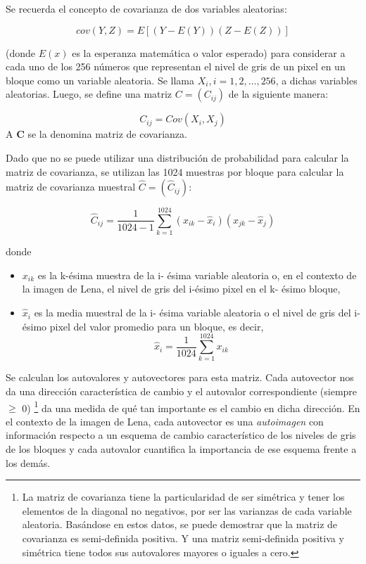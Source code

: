 \documentclass[twocolumn,a4paper,10pt]{article}
\begin{document}
Se recuerda el concepto de covarianza de dos variables aleatorias:

\begin{equation}
    cov(Y, Z) = E [(Y - E(Y )) (Z - E(Z))]
\end{equation}

(donde $E(x)$ es la esperanza matem\'atica o valor esperado) para considerar a cada uno de los 256 n\'umeros que representan el nivel de gris de un pixel en un bloque como un variable aleatoria.
Se llama $X_{i}, i = 1, 2, \dotsc, 256$, a dichas variables aleatorias. Luego, se define una matriz $C = (C_{ij} )$ de la siguiente manera:

\begin{equation}
    C_{ij} = Cov(X_{i}, X_{j})
\end{equation}
A $\textbf{C}$ se la denomina matriz de covarianza.

Dado que no se puede utilizar una distribución de probabilidad para calcular la matriz de covarianza, se utilizan las 1024 muestras por bloque para calcular la matriz de covarianza muestral $\widehat{C} = (\widehat{C}_{ij})$:

\begin{equation}
    \widehat{C}_{ij} =  \frac{1}{1024 - 1}\sum_{k=1}^{1024} (x_{ik} - \widehat{x}_{i}) (x_{jk} - \widehat{x}_{j})
\end{equation}

donde
\begin{itemize}
    \item $x_{ik}$ es la k-\'esima muestra de la i- \'esima variable aleatoria o, en el contexto de la imagen de Lena, el nivel de gris del i-\'esimo pixel en el 
    k- \'esimo bloque,
    \item $\widehat{x}_{i}$ es la media muestral de la i- \'esima variable aleatoria o el nivel de gris del i-\'esimo pixel del valor promedio para un bloque, es decir,
    \[ \widehat{x}_{i} = \frac{1}{1024} \sum_{k=1}^{1024} x_{ik} \]
\end{itemize}

Se calculan los autovalores y autovectores para esta matriz. Cada autovector nos da una direcci\'on caracter\'istica de cambio y el autovalor correspondiente  (siempre $\geq$ 0) \footnote{La matriz de covarianza tiene la particularidad de ser sim\'etrica y tener los elementos de la diagonal no negativos, por ser las varianzas de cada variable aleatoria. Bas\'andose en estos datos, se puede demostrar que la matriz de covarianza es semi-definida positiva. Y una matriz semi-definida positiva y sim\'etrica tiene todos sus autovalores mayores o iguales a cero.} da una medida de qu\'e tan importante es el cambio en dicha direcci\'on. En el contexto de la imagen de Lena, cada autovector es una \textit{autoimagen} con información respecto a un esquema de cambio caracter\'istico de los niveles de gris de los bloques y cada autovalor cuantifica la importancia de ese esquema frente a los dem\'as.
\end{document}

